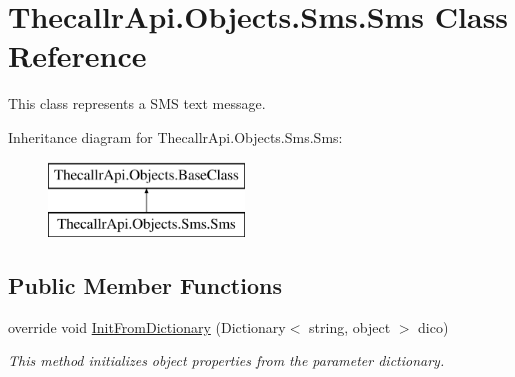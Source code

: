\hypertarget{class_thecallr_api_1_1_objects_1_1_sms_1_1_sms}{\section{Thecallr\+Api.\+Objects.\+Sms.\+Sms Class Reference}
\label{class_thecallr_api_1_1_objects_1_1_sms_1_1_sms}
}


This class represents a S\+M\+S text message.  


Inheritance diagram for Thecallr\+Api.\+Objects.\+Sms.\+Sms\+:\begin{figure}[H]
\begin{center}
\leavevmode
\includegraphics[height=2.000000cm]{class_thecallr_api_1_1_objects_1_1_sms_1_1_sms}
\end{center}
\end{figure}
\subsection*{Public Member Functions}
\begin{DoxyCompactItemize}
\item 
override void \hyperlink{class_thecallr_api_1_1_objects_1_1_sms_1_1_sms_aa9122320673a83b153a63008b0caa055}{Init\+From\+Dictionary} (Dictionary$<$ string, object $>$ dico)
\begin{DoxyCompactList}\small\item\em This method initializes object properties from the parameter dictionary. \end{DoxyCompactList}\end{DoxyCompactItemize}
